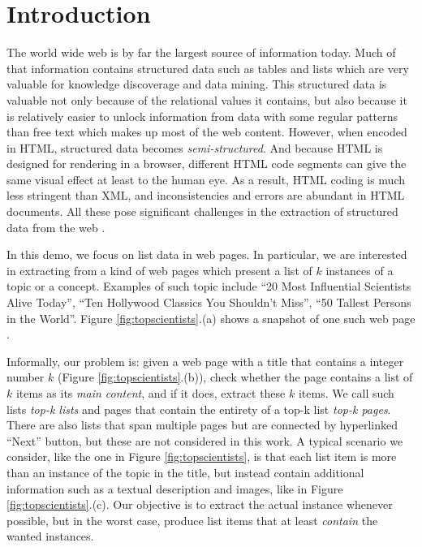 \section{Introduction}
The world wide web is by far the largest source of information today.
Much of that information contains structured data such as tables and lists
which are very valuable for knowledge discoverage and data mining. 
This structured data is valuable not only because of the relational
values it contains, but also because it is relatively easier to unlock
information from data with some regular patterns than free text which
makes up most of the web content. However, when encoded in HTML, 
structured data becomes {\em semi-structured}. 
And because HTML is designed for rendering in a browser, different
HTML code segments can give the same visual effect at least to
the human eye. As a result, 
HTML coding is much less stringent than XML, and
inconsistencies and errors are abundant in HTML documents. 
All these pose significant challenges in the extraction of structured 
data from the web \cite{Weninger10:UnexpectedList}.

In this demo, we focus on list data in web pages. In particular, we are 
interested in extracting from a kind of web pages which present
a list of $k$ instances of a topic or a concept. Examples of such topic include 
``20 Most Influential Scientists Alive Today'', 
``Ten Hollywood Classics You Shouldn't Miss'', 
``50 Tallest Persons in the World''. Figure \ref{fig:topscientists}.(a)
shows a snapshot of one such web page \cite{InfluentialScientists}.

\begin{figure*}[th]
        \centering
        \caption{Snapshot of a typical {\em top-k page} and its page segments}
        \label{fig:topscientists}
\end{figure*}


Informally, our problem is: given a web page with a title that contains
a integer number $k$ (Figure \ref{fig:topscientists}.(b)), 
check whether the page contains a list of $k$ items
as its {\em main content}, and if it does, extract these $k$ items. 
We call such lists {\em top-k lists} and pages that contain the 
entirety of a top-k list {\em top-k pages}. 
There are also lists that span multiple pages but are connected by 
hyperlinked ``Next'' button,
but these are not considered in this work. 
A typical scenario we consider, 
like the one in Figure \ref{fig:topscientists}, is that
each list item is more than an instance of the topic in the title, 
but instead contain additional information such as 
a textual description and images, like in Figure \ref{fig:topscientists}.(c). 
Our objective is to extract the actual instance whenever possible, 
but in the worst case, produce list items that at least {\em contain} 
the wanted instances.

